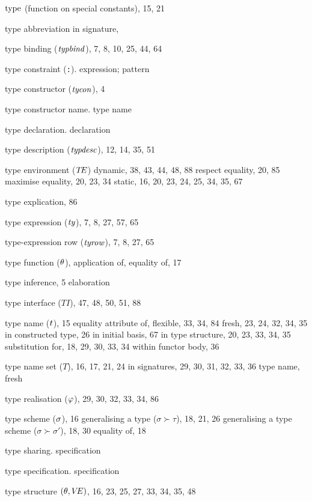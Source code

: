 \begin{theindex}
\item $\mathop{\rm type}\nolimits$ (function on special constants), 15, 21
\item type abbreviation in signature, \typabbrinsigsrefs
\item type binding (${\it typbind}$),  7, 8, 10, 25, 44, 64
\item type constraint (\verb+:+). \see expression; pattern 
\item type constructor (${\it tycon}$), 4
\item type constructor name. \see type name 
\item type declaration. \see declaration
\item type description (${\it typdesc}$), 12, 14, 35, 51
\item type environment ($\mbox{$T\!E$}$)
\subitem dynamic, 38,  43, 44, 48, 88
\subitem respect equality, 20, 85
\subitem maximise equality, 20, 23, 34
\subitem static, 16, 20, 23, 24, 25, 34, 35, 67
\item type explication, 86
\item type expression (${\it ty}$), 7, 8, 27, 57, 65
\item type-expression row (${\it tyrow}$), 7, 8, 27, 65
\item type function ($\theta$), \Lambdarefs
\subitem application of, \typefunctionrefs
\subitem equality of, 17
\item type inference, 5
\subitem \seealso elaboration
\item type interface ($T\!I$), 47, 48, 50, 51, 88
\item type name ($t$), 15
\subitem equality attribute of, \eqtynamerefs
\subitem flexible, 33, 34, 84
\subitem fresh, 23, 24, 32, 34, 35
\subitem in constructed type, 26
\subitem in initial basis, 67
\subitem in type structure, 20, 23, 33, 34, 35
\subitem substitution for, 18, 29, 30, 33, 34
\subitem within functor body, 36
\item type name set ($T$), 16, 17, 21, 24
\subitem in signatures,  29, 30, 31, 32, 33, 36
\subitem \seealso type name, fresh
\item type realisation ($\varphi$), 29, 30, 32, 33, 34, 86
\item type scheme ($\sigma$), 16
\subitem generalising a type ($\sigma\succ\tau$), 18, 21, 26
\subitem generalising a type scheme ($\sigma\succ\sigma'$), 18, 30
\subitem equality of, 18
\item type sharing. \see specification
\item type specification. \see specification
\item type structure $(\theta,\mbox{$V\!E$})$, 16, 23, 25, 27, 33, 34, 35, 48

\end{theindex}
